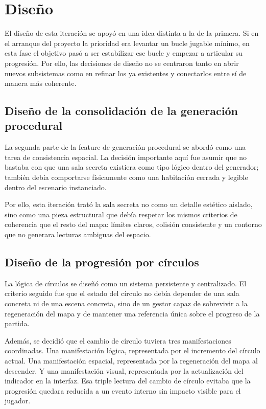 \section{Diseño}
El diseño de esta iteración se apoyó en una idea distinta a la de la primera. Si en el
arranque del proyecto la prioridad era levantar un bucle jugable mínimo, en esta fase el
objetivo pasó a ser estabilizar ese bucle y empezar a articular su progresión. Por ello,
las decisiones de diseño no se centraron tanto en abrir nuevos subsistemas como en refinar
los ya existentes y conectarlos entre sí de manera más coherente.

\subsection{Diseño de la consolidación de la generación procedural}
La segunda parte de la feature de generación procedural se abordó como una tarea de
consistencia espacial. La decisión importante aquí fue asumir que no bastaba con que una
sala secreta existiera como tipo lógico dentro del generador; también debía comportarse
físicamente como una habitación cerrada y legible dentro del escenario instanciado.

Por ello, esta iteración trató la sala secreta no como un detalle estético aislado, sino
como una pieza estructural que debía respetar los mismos criterios de coherencia que el
resto del mapa: límites claros, colisión consistente y un contorno que no generara lecturas
ambiguas del espacio.

\subsection{Diseño de la progresión por círculos}
La lógica de círculos se diseñó como un sistema persistente y centralizado. El criterio
seguido fue que el estado del círculo no debía depender de una sala concreta ni de una
escena concreta, sino de un gestor capaz de sobrevivir a la regeneración del mapa y de
mantener una referencia única sobre el progreso de la partida.

Además, se decidió que el cambio de círculo tuviera tres manifestaciones coordinadas. Una
manifestación lógica, representada por el incremento del círculo actual. Una manifestación
espacial, representada por la regeneración del mapa al descender. Y una manifestación
visual, representada por la actualización del indicador en la interfaz. Esa triple lectura
del cambio de círculo evitaba que la progresión quedara reducida a un evento interno sin
impacto visible para el jugador.

